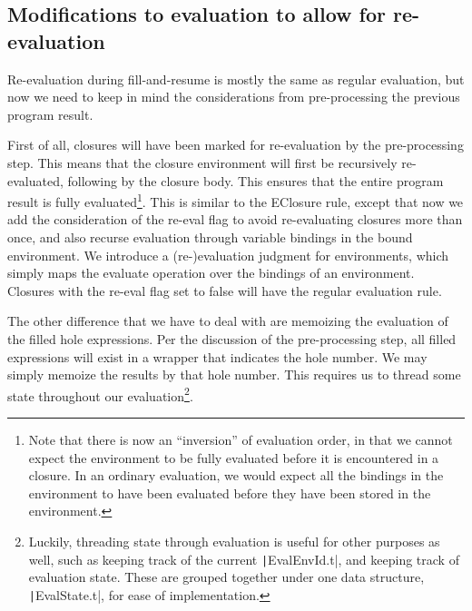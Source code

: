 \subsection{Modifications to evaluation to allow for re-evaluation}
\label{sec:re-eval}

Re-evaluation during fill-and-resume is mostly the same as regular evaluation, but now we need to keep in mind the considerations from pre-processing the previous program result.

First of all, closures will have been marked for re-evaluation by the pre-processing step. This means that the closure environment will first be recursively re-evaluated, following by the closure body. This ensures that the entire program result is fully evaluated\footnote{Note that there is now an ``inversion'' of evaluation order, in that we cannot expect the environment to be fully evaluated before it is encountered in a closure. In an ordinary evaluation, we would expect all the bindings in the environment to have been evaluated before they have been stored in the environment.}. This is similar to the EClosure rule, except that now we add the consideration of the re-eval flag to avoid re-evaluating closures more than once, and also recurse evaluation through variable bindings in the bound environment. We introduce a (re-)evaluation judgment for environments, which simply maps the evaluate operation over the bindings of an environment. Closures with the re-eval flag set to false will have the regular evaluation rule.

\begin{singlespace}
\end{singlespace}


The other difference that we have to deal with are memoizing the evaluation of the filled hole expressions. Per the discussion of the pre-processing step, all filled expressions will exist in a wrapper that indicates the hole number. We may simply memoize the results by that hole number. This requires us to thread some state throughout our evaluation\footnote{Luckily, threading state through evaluation is useful for other purposes as well, such as keeping track of the current \texttt|EvalEnvId.t|, and keeping track of evaluation state. These are grouped together under one data structure, \texttt|EvalState.t|, for ease of implementation.}.

